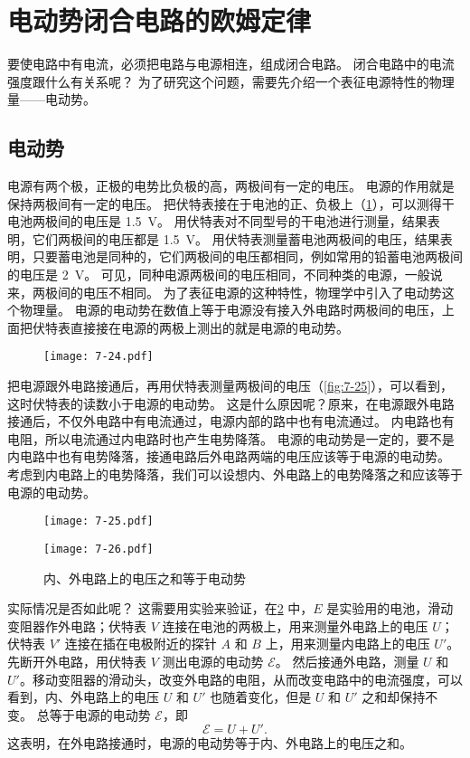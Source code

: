 \section{电动势\texorpdfstring{\quad}{ }闭合电路的欧姆定律}

要使电路中有电流，必须把电路与电源相连，组成闭合电路。
闭合电路中的电流强度跟什么有关系呢？
为了研究这个问题，需要先介绍一个表征电源特性的物理量——电动势。

\subsection{电动势}
电源有两个极，正极的电势比负极的高，两极间有一定的电压。
电源的作用就是保持两极间有一定的电压。
把伏特表接在于电池的正、负极上（\cref{fig:7-24}），可以测得干电池两极间的电压是 \qty{1.5}{V}。
用伏特表对不同型号的干电池进行测量，结果表明，它们两极间的电压都是 \qty{1.5}{V}。
用伏特表测量蓄电池两极间的电压，结果表明，只要蓄电池是同种的，它们两极间的电压都相同，例如常用的铅蓄电池两极间的电压是 \qty{2}{V}。
可见，同种电源两极间的电压相同，不同种类的电源，一般说来，两极间的电压不相同。
为了表征电源的这种特性，物理学中引入了电动势这个物理量。
电源的电动势在数值上等于电源没有接入外电路时两极间的电压，上面把伏特表直接接在电源的两极上测出的就是电源的电动势。
\begin{figure}
  \texttt{[image: 7-24.pdf]}
  \caption{}\label{fig:7-24}
\end{figure}

把电源跟外电路接通后，再用伏特表测量两极间的电压（\cref{fig:7-25}），可以看到，这时伏特表的读数小于电源的电动势。
这是什么原因呢？原来，在电源跟外电路接通后，不仅外电路中有电流通过，电源内部的路中也有电流通过。
内电路也有电阻，所以电流通过内电路时也产生电势降落。
电源的电动势是一定的，要不是内电路中也有电势降落，接通电路后外电路两端的电压应该等于电源的电动势。
考虑到内电路上的电势降落，我们可以设想内、外电路上的电势降落之和应该等于电源的电动势。
\begin{figure}
  \begin{minipage}[b]{0.35\linewidth}\centering
    \texttt{[image: 7-25.pdf]}
    \caption{}\label{fig:7-25}
  \end{minipage}
  \begin{minipage}[b]{0.60\linewidth}\centering
    \texttt{[image: 7-26.pdf]}
    \caption{内、外电路上的电压之和等于电动势}\label{fig:7-26}
  \end{minipage}
\end{figure}

实际情况是否如此呢？
这需要用实验来验证，在\cref{fig:7-26} 中，$E$ 是实验用的电池，滑动变阻器作外电路；伏特表 $V$ 连接在电池的两极上，用来测量外电路上的电压 $U$；伏特表 $V'$ 连接在插在电极附近的探针 $A$ 和 $B$ 上，用来测量内电路上的电压 $U'$。
先断开外电路，用伏特表 $V$ 测出电源的电动势 $\mathcal{E}$。
然后接通外电路，测量 $U$ 和 $U'$。移动变阻器的滑动头，改变外电路的电阻，从而改变电路中的电流强度，可以看到，内、外电路上的电压 $U$ 和 $U'$ 也随着变化，但是 $U$ 和 $U'$ 之和却保持不变。
总等于电源的电动势 $\mathcal{E}$，即
\[\mathcal{E}=U+U'.\]
这表明，在外电路接通时，电源的电动势等于内、外电路上的电压之和。

